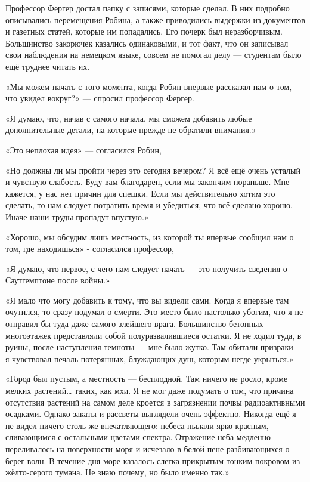 \documentclass[a4paper,12pt]{book}
\begin{document}
\par
Профессор Фергер достал папку с записями, которые сделал. В них подробно описывались перемещения Робина, а также приводились выдержки из документов и газетных статей, которые им попадались. Его почерк был неразборчивым. Большинство закорючек казались одинаковыми, и тот факт, что он записывал свои наблюдения на немецком языке, совсем не помогал делу — студентам было ещё труднее читать их.
\par
«Мы можем начать с того момента, когда Робин впервые рассказал нам о том, что увидел вокруг?» — спросил профессор Фергер.
\par
«Я думаю, что, начав с самого начала, мы сможем добавить любые дополнительные детали, на которые прежде не обратили внимания.»
\par
«Это неплохая идея» — согласился Робин,
\par
«Но должны ли мы пройти через это сегодня вечером? Я всё ещё очень усталый и чувствую слабость. Буду вам благодарен, если мы закончим пораньше. Мне кажется, у нас нет причин для спешки. Если мы действительно хотим это сделать, то нам следует потратить время и убедиться, что всё сделано хорошо. Иначе наши труды пропадут впустую.»
\par
«Хорошо, мы обсудим лишь местность, из которой ты впервые сообщил нам о том, где находишься» - согласился профессор,
\par
«Я думаю, что первое, с чего нам следует начать — это получить сведения о Саутгемптоне после войны.»
\par
«Я мало что могу добавить к тому, что вы видели сами. Когда я впервые там очутился, то сразу подумал о смерти. Это место было настолько убогим, что я не отправил бы туда даже самого злейшего врага. Большинство бетонных многоэтажек представляли собой полуразвалившиеся остатки. Я не ходил туда, в руины, после наступления темноты — мне было жутко. Там обитали призраки — я чувствовал печаль потерянных, блуждающих душ, которым негде укрыться.»
\par
«Город был пустым, а местность — бесплодной. Там ничего не росло, кроме мелких растений… таких, как мхи. Я не мог даже подумать о том, что причина отсутствия растений на самом деле кроется в загрязнении почвы радиоактивными осадками. Однако закаты и рассветы выглядели очень эффектно. Никогда ещё я не видел ничего столь же впечатляющего: небеса пылали ярко-красным, сливающимся с остальными цветами спектра. Отражение неба медленно переливалось на поверхности моря и исчезало в белой пене разбивающихся о берег волн. В течение дня море казалось слегка прикрытым тонким покровом из жёлто-серого тумана. Не знаю почему, но было именно так.»
\end{document}
